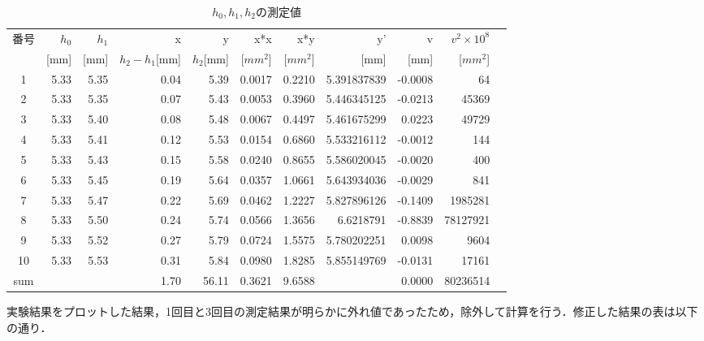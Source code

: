 \documentclass[a4paper,1pt]{jsarticle}
\begin{document}
\begin{table}[H]
  \caption{$h_0,h_1,h_2$の測定値}
  \label{table:SpeedOfLight}
  \centering
  \begin{tabular}{|c||r|r|r|r|r|r|r|r|r|r|}
    \hline
    番号 & $h_0$ & $h_1$ & x & y & x*x & x*y & y' & v & $v^2\times10^8$\\
    &[mm] & [mm] & $h_2-h_1$[mm] & $h_2$[mm] & [$mm^2$] & [$mm^2$] & [mm] & [mm] & [$mm^2$]\\
    \hline \hline
    1 & 5.33 & 5.35 & 0.04 & 5.39 & 0.0017 & 0.2210 & 5.391837839 & -0.0008 & 64 \\
    2 & 5.33 & 5.35 & 0.07 & 5.43 & 0.0053 & 0.3960 & 5.446345125 & -0.0213 & 45369 \\
    3 & 5.33 & 5.40 & 0.08 & 5.48 & 0.0067 & 0.4497 & 5.461675299 & 0.0223 & 49729 \\
    4 & 5.33 & 5.41 & 0.12 & 5.53 & 0.0154 & 0.6860 & 5.533216112 & -0.0012 & 144 \\
    5 & 5.33 & 5.43 & 0.15 & 5.58 & 0.0240 & 0.8655 & 5.586020045 & -0.0020 & 400 \\
    6 & 5.33 & 5.45 & 0.19 & 5.64 & 0.0357 & 1.0661 & 5.643934036 & -0.0029 & 841 \\
    7 & 5.33 & 5.47 & 0.22 & 5.69 & 0.0462 & 1.2227 & 5.827896126 & -0.1409 & 1985281 \\
    8 & 5.33 & 5.50 & 0.24 & 5.74 & 0.0566 & 1.3656 & 6.6218791 & -0.8839 & 78127921 \\
    9 & 5.33 & 5.52 & 0.27 & 5.79 & 0.0724 & 1.5575 & 5.780202251 & 0.0098 & 9604 \\
    10 & 5.33 & 5.53 & 0.31 & 5.84 & 0.0980 & 1.8285 & 5.855149769 & -0.0131 & 17161 \\
    \hline
    sum &  &  & 1.70 & 56.11 & 0.3621 & 9.6588 &  & 0.0000 & 80236514 \\
    \hline
  \end{tabular}


\end{table}

実験結果をプロットした結果，1回目と3回目の測定結果が明らかに外れ値であったため，除外して計算を行う．修正した結果の表は以下の通り．
\end{document}
